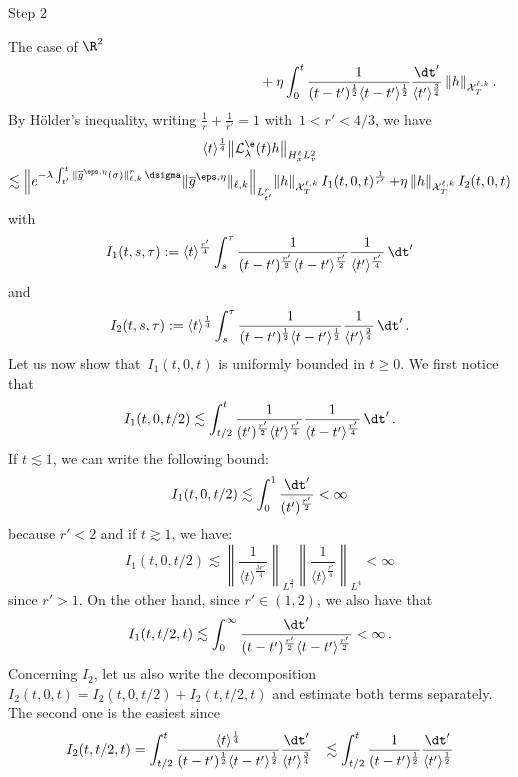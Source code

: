 \begin{step}{Step 2}
\begin{step}{The case of $\R^2$}
\begin{align*}
&\mkern 325mu + { \eta \int_0^t \frac{1}{(t-t')^\frac12 \langle t-t' \rangle^\frac12 } \frac{\dt'}{{\langle t' \rangle^{\frac34}}} \, \|h\|_{\mathcal{X}_T^{\ell,k}} } \,.
\end{align*}
By H\"older's inequality, writing $ \frac1r+\frac1{r'} = 1$ with~$1<r'<4/3$, we have
\begin{multline}\label{LlambdaHell}
\langle t \rangle^\frac{1}{4} \big \| \mathcal{L}_\lambda^{\e}(t) h\big\|_{H^\ell_x L^2_v} \\
\lesssim \Big\| e^{- \lambda \int_{t'}^t \|\overline g^{\eps,\eta}(\sigma)\|_{\ell,k}^r\, \dsigma } \|\overline g^{\eps,\eta}\|_{\ell,k} \Big\|_{L^{r}_{t'}} \|h\|_{\mathcal{X}_T^{\ell,k}}\, I_1(t,0,t)^{\frac1{r' }}\, {+ \eta \, \|h\|_{\mathcal{X}_T^{\ell,k}}\, I_2(t,0,t)}
\end{multline}
with
\[
I_1(t,s,\tau):= \langle t \rangle^{\frac{r'}4} \int_s^\tau \frac{1}{(t-t')^{\frac{r'}2}\langle t-t' \rangle^{\frac{r'}2}}\frac{1}{\langle t' \rangle^{\frac{r'}4}} \, \dt'
\]
and
\[
{I_2(t,s,\tau) := \langle t \rangle^{\frac 14} \int_s^\tau \frac{1}{(t-t')^{\frac{1}2}\langle t-t' \rangle^\frac12}\frac{1}{\langle t' \rangle^{\frac{3}4}} \, \dt' \,.}
\]
Let us now show that~$ I_1(t,0,t)$ is uniformly bounded in $t \ge 0$. We first notice that
\begin{align*}
I_1(t,0,t/2) \lesssim \int_{t/2}^t \frac{1}{(t')^{\frac{r'}2}\langle t' \rangle^{\frac{r'}4}} \frac{1}{\langle t-t' \rangle^{\frac{r'}4}} \, \dt' \,.
\end{align*}
If $t \lesssim 1$, we can write the following bound:
\[
I_1(t,0,t/2)
\lesssim \int_0^1 \frac{\dt'}{(t')^{\frac{r'}2}} < \infty
\]
because $r'<2$ and if $t \gtrsim 1$, we have:
\[
I_1(t,0,t/2) \lesssim \left\| \frac{1}{{\langle t \rangle^{\frac{3r'}4}}} \right\|_{L^{\frac43}} \left\| \frac{1}{{\langle t \rangle^{\frac{r'}4}}} \right\|_{L^4 } < \infty
\]
since $r'>1$. On the other hand, since $r' \in (1,2)$, we also have that
\begin{align*}
I_1(t,t/2,t) \lesssim \int_0^\infty \frac{\dt'}{(t-t')^{\frac{r'}2}\langle t-t' \rangle^{\frac{r'}2}} < \infty \,.
\end{align*}
Concerning $I_2$, let us also write the decomposition~$ I_2(t,0,t)= I_2(t,0,t/2)+ I_2(t,t/2,t)$ and estimate both terms separately. The second one is the easiest since
\[
\begin{aligned} I_2(t,t/2,t) &= \int_{ t/2}^t \frac{\langle t \rangle^{\frac14} }{(t-t')^{\frac12} \langle t-t' \rangle^\frac12}\frac{\dt'}{\langle t' \rangle^{\frac34}} &\lesssim \int_{ t/2}^t \frac{1}{(t-t')^{\frac12}}\frac{\dt'}{\langle t' \rangle^{\frac12}}

\end{aligned}\]
\end{step}
\end{step}
